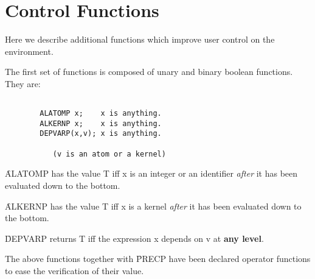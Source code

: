 \section{Control Functions}
Here we describe additional functions which
improve user control on the environment.
\bi
\item[i.]
The first set of functions is composed of unary and binary boolean functions.
They are:
\begin{verbatim}

        ALATOMP x;    x is anything.
        ALKERNP x;    x is anything.
        DEPVARP(x,v); x is anything.

           (v is an atom or a kernel)

\end{verbatim}
\f{ALATOMP} has the value T iff x is an integer or  an identifier
{\em after} it has been evaluated down to the bottom.

\f{ALKERNP} has the value T iff x is a kernel {\em after}
it has been evaluated down to the bottom.

\f{DEPVARP} returns T iff the expression x depends on v at
{\bf any level}.

The above functions together with \f{PRECP} have
 been declared operator functions to ease the verification of
their value.

